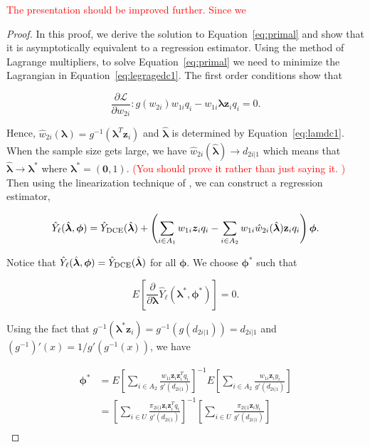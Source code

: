 \documentclass[12pt]{article}
\renewcommand{\bf}[1]{\mathbf{#1}}
\begin{document}
\textcolor{red}{The presentation should be improved further. Since we 

}

\begin{proof}
  In this proof, we derive the solution to Equation~\ref{eq:primal} and show
  that it is asymptotically equivalent to a regression estimator. Using the
  method of Lagrange multipliers, to solve Equation~\eqref{eq:primal} we need to
  minimize the Lagrangian in Equation~\eqref{eq:legragedc1}. 
  The first order conditions show that

  $$
  \frac{\partial \mathcal{L}}{\partial w_{2i}}: g(w_{2i}) w_{1i}q_i -
  w_{1i} \bm \lambda \bf z_i q_i = 0.
  $$

  Hence, $\hat w_{2i}(\bm \lambda) = g^{-1}(\bm \lambda^T \bf z_i)$ and
  $\hat{\bm \lambda}$ is determined by Equation~\eqref{eq:lamdc1}. When the
  sample size gets large, we have $\hat w_{2i}(\hat{\bm \lambda}) \to
  d_{2i|1}$ which means that $\hat{\bm \lambda} \to \bm \lambda^*$ where $\bm
  \lambda^* = (\bf 0, 1)$. \textcolor{red}{(You should prove it rather than just saying it. ) }  
  Then using the linearization technique of
  \cite{randles1982asymptotic}, we can construct a regression estimator, 

  $$
  \hat Y_\ell(\hat{\bm \lambda}, \bm \phi)  = \hat Y_{\rm DCE}(\hat{\bm \lambda}) + 
  \left(\sum_{i \in A_1} w_{1i} \bm z_i q_i - \sum_{i \in A_2} w_{1i} 
  \hat w_{2i}(\hat{\bm \lambda}) \bf z_i q_i\right)\bm \phi.
  $$

  Notice that $\hat Y_\ell(\hat{\bm \lambda}, \bm \phi) = \hat Y_{\rm DCE}(\hat{\bm
  \lambda})$ for all $\bm \phi$. We choose $\bm \phi^*$ such that

  $$
  E\left[\frac{\partial}{\partial \bm \lambda} \hat Y_\ell(\bm \lambda^*,
  \bm \phi^*)\right]=0.
  $$

  Using the fact that $g^{-1}(\bm \lambda^* \bf z_i) = g^{-1}(g(d_{2i|1})) = d_{2i|1}$
  and $(g^{-1})'(x) = 1 / g'(g^{-1}(x))$, we have

  \begin{align*}
    \bm \phi^*
    &= E\left[\sum_{i \in A_2} \frac{w_{1i}\bf z_i \bf z_i^T q_i}{g'(d_{2i|1})}
    \right]^{-1}
    E\left[\sum_{i \in A_2} \frac{w_{1i}\bf z_i y_i}{g'(d_{2i|1})}\right]\\
    &= \left[\sum_{i \in U} \frac{\pi_{2i|1} \bf z_i \bf z_i^T q_i}{g'(d_{2i|1})}
    \right]^{-1}
    \left[\sum_{i \in U} \frac{\pi_{2i|1} \bf z_i y_i}{g'(d_{2i|1})}\right]\\
  \end{align*}


\end{proof}
\end{document}
